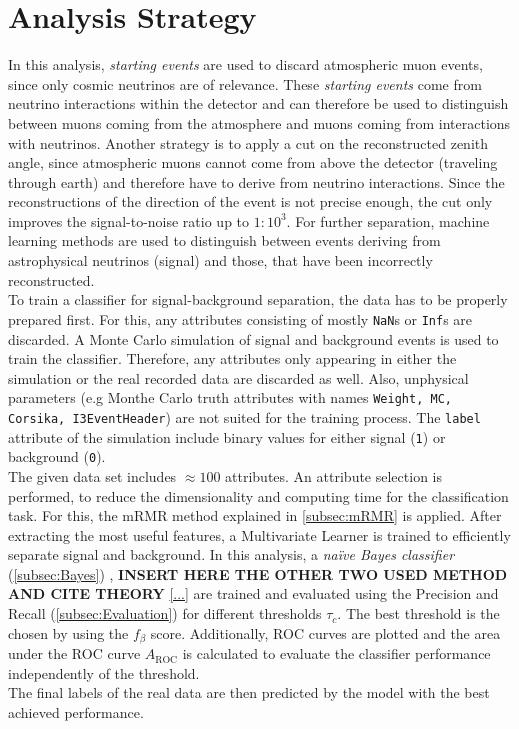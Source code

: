 \section{Analysis Strategy}
\label{sec:Strategy}
In this analysis, \textit{starting events} are used to discard atmospheric muon events, since only cosmic neutrinos are of relevance. These \textit{starting events} come from neutrino
interactions within the detector and can therefore be used to distinguish between muons coming from the atmosphere and muons coming from interactions with neutrinos. Another strategy is 
to apply a cut on the reconstructed zenith angle, since atmospheric muons cannot come from above the detector (traveling through earth) and therefore have to derive from neutrino interactions.
Since the reconstructions of the direction of the event is not precise enough, the cut only improves the signal-to-noise ratio up to $1:10^3$. For further separation, machine learning
methods are used to distinguish between events deriving from astrophysical neutrinos (signal) and those, that have been incorrectly reconstructed.\\
To train a classifier for signal-background separation, the data has to be properly prepared first. For this, any attributes consisting of mostly \texttt{NaN}s or \texttt{Inf}s are discarded.
A Monte Carlo simulation of signal and background events is used to train the classifier. Therefore, any attributes only appearing in either the simulation or the real recorded data are
discarded as well. Also, unphysical parameters (e.g Monthe Carlo truth attributes with names \texttt{Weight, MC, Corsika, I3EventHeader}) are not suited for the training process. The \texttt{label}
attribute of the simulation include binary values for either signal (\texttt{1}) or background (\texttt{0}).\\
The given data set includes $\approx 100$ attributes. An attribute selection is performed, to reduce the dimensionality and computing time for the classification task. For this, the mRMR method explained
in \autoref{subsec:mRMR} is applied. After extracting the most useful features, a Multivariate Learner is trained to efficiently separate signal and background. In this analysis, a \textit{na\"ive Bayes classifier} (\autoref{subsec:Bayes})
, \textbf{INSERT HERE THE OTHER TWO USED METHOD AND CITE THEORY} \autoref{...} are trained and evaluated using the Precision and Recall (\autoref{subsec:Evaluation}) for different thresholds $\tau_c$. The best threshold is the chosen by 
using the $f_{\beta}$ score. Additionally, ROC curves are plotted and the area under the ROC curve $A_{\mathrm{ROC}}$ is calculated to evaluate the classifier performance independently of the threshold.\\
The final labels of the real data are then predicted by the model with the best achieved performance.
